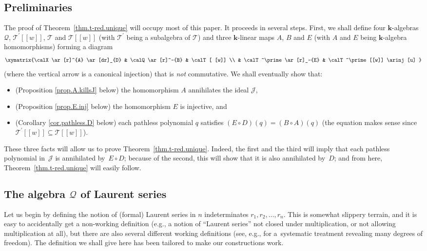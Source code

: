 \subsection{Preliminaries}

The proof of Theorem~\ref{thm.t-red.unique} will occupy most of this paper. It proceeds in several steps. First, we shall define four $\mathbf{k}$-algebras $\mathcal{Q}$, $\mathcal{T}^{\prime} [ [w] ] $, $\mathcal{T}$ and $\mathcal{T}[[w]] $ (with $\mathcal{T}^{\prime}$ being a subalgebra of $\mathcal{T}$) and three $\mathbf{k}$-linear maps $A$, $B$ and $E$ (with $A$ and $E$ being $\mathbf{k}$-algebra homomorphisms) forming a diagram
\begin{gather*}
\xymatrix{\calX\ar[r]^{A} \ar[dr]_{D} & \calQ\ar[r]^-{B} & \calT [ [w]] \\
& \calT^\prime\ar[r]_-{E} & \calT^\prime[[w]] \arinj[u]
}
\end{gather*}
(where the vertical arrow is a canonical injection) that is \textit{not} commutative. We shall eventually show that:
\begin{itemize}\itemsep=0pt
\item (Proposition \ref{prop.A.killsJ} below) the homomorphism $A$ annihilates the ideal $\mathcal{J}$,

\item (Proposition \ref{prop.E.inj} below) the homomorphism $E$ is injective, and

\item (Corollary \ref{cor.pathless.D} below) each pathless polynomial $q$ satisfies $( E\circ D) (q) =( B\circ A ) (q) $ (the equation makes sense since $\mathcal{T}^{\prime}[[w]] \subseteq\mathcal{T}[[w]]$).
\end{itemize}

These three facts will allow us to prove Theorem~\ref{thm.t-red.unique}. Indeed, the first and the third will imply that each pathless polynomial in~$\mathcal{J}$ is annihilated by~$E\circ D$; because of the second, this will
show that it is also annihilated by~$D$; and from here, Theorem~\ref{thm.t-red.unique} will easily follow.

\subsection[The algebra $\mathcal{Q}$ of Laurent series]{The algebra $\boldsymbol{\mathcal{Q}}$ of Laurent series}

Let us begin by defining the notion of (formal) Laurent series in $n$ indeterminates $r_{1},r_{2},\ldots,r_{n}$. This is somewhat slippery terrain, and it is easy to accidentally get a non-working definition (e.g., a notion of ``Laurent series'' not closed under multiplication, or not allowing multiplication at all), but there are also several different working definitions (see, e.g., \cite{MonKau13} for a~systematic treatment revealing many degrees of freedom). The definition we shall give here has been tailored to make our constructions work.

